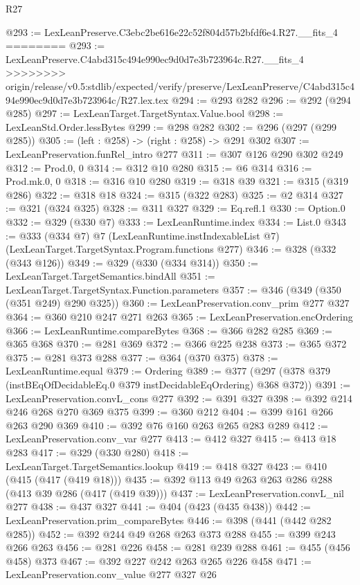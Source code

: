 \begin{lexlean}{R27}
\begin{coremodule}
{{{{{{{{{{{@293 := LexLeanPreserve.C3ebc2be616e22c52f804d57b2bfdf6e4.R27.__fits_4
========
@293 := LexLeanPreserve.C4abd315c494e990ec9d0d7e3b723964c.R27.__fits_4
>>>>>>>> origin/release/v0.5:stdlib/expected/verify/preserve/LexLeanPreserve/C4abd315c494e990ec9d0d7e3b723964c/R27.lex.tex
@294 := @293 @282
@296 := @292 (@294 @285)
@297 := LexLeanTarget.TargetSyntax.Value.bool
@298 := LexLeanStd.Order.lessBytes
@299 := @298 @282
@302 := @296 (@297 (@299 @285))
@305 := (left : @258) -> (right : @258) -> @291 @302
@307 := LexLeanPreservation.funRel_intro @277
@311 := @307 @126 @290 @302 @249
@312 := Prod.{0, 0}
@314 := @312 @10 @280
@315 := @6 @314
@316 := Prod.mk.{0, 0}
@318 := @316 @10 @280
@319 := @318 @39
@321 := @315 (@319 @286)
@322 := @318 @18
@324 := @315 (@322 @283)
@325 := @2 @314
@327 := @321 (@324 @325)
@328 := @311 @327
@329 := Eq.refl.{1}
@330 := Option.{0}
@332 := @329 (@330 @7)
@333 := LexLeanRuntime.index
@334 := List.{0}
@343 := @333
    (@334 @7)
    @7
    (LexLeanRuntime.instIndexableList @7)
    (LexLeanTarget.TargetSyntax.Program.functions @277)
@346 := @328 (@332 (@343 @126))
@349 := @329 (@330 (@334 @314))
@350 := LexLeanTarget.TargetSemantics.bindAll
@351 := LexLeanTarget.TargetSyntax.Function.parameters
@357 := @346 (@349 (@350 (@351 @249) @290 @325))
@360 := LexLeanPreservation.conv_prim @277 @327
@364 := @360 @210 @247 @271 @263
@365 := LexLeanPreservation.encOrdering
@366 := LexLeanRuntime.compareBytes
@368 := @366 @282 @285
@369 := @365 @368
@370 := @281 @369
@372 := @366 @225 @238
@373 := @365 @372
@375 := @281 @373 @288
@377 := @364 (@370 @375)
@378 := LexLeanRuntime.equal
@379 := Ordering
@389 := @377 (@297 (@378 @379 (instBEqOfDecidableEq.{0} @379 instDecidableEqOrdering) @368 @372))
@391 := LexLeanPreservation.convL_cons @277
@392 := @391 @327
@398 := @392 @214 @246 @268 @270 @369 @375
@399 := @360 @212
@404 := @399 @161 @266 @263 @290 @369
@410 := @392 @76 @160 @263 @265 @283 @289
@412 := LexLeanPreservation.conv_var @277
@413 := @412 @327
@415 := @413 @18 @283
@417 := @329 (@330 @280)
@418 := LexLeanTarget.TargetSemantics.lookup
@419 := @418 @327
@423 := @410 (@415 (@417 (@419 @18)))
@435 := @392 @113 @49 @263 @263 @286 @288 (@413 @39 @286 (@417 (@419 @39)))
@437 := LexLeanPreservation.convL_nil @277
@438 := @437 @327
@441 := @404 (@423 (@435 @438))
@442 := LexLeanPreservation.prim_compareBytes
@446 := @398 (@441 (@442 @282 @285))
@452 := @392 @244 @49 @268 @263 @373 @288
@455 := @399 @243 @266 @263
@456 := @281 @226
@458 := @281 @239 @288
@461 := @455 (@456 @458) @373
@467 := @392 @227 @242 @263 @265 @226 @458
@471 := LexLeanPreservation.conv_value @277 @327 @26
}}}}}}}}}}}
\end{coremodule}
\end{lexlean}
